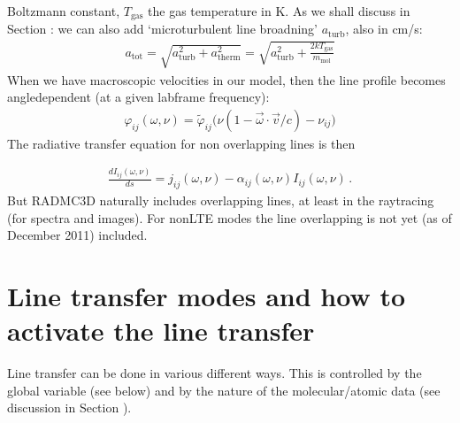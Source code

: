 \documentclass[letterpaper,10pt,english]{sphinxmanual}
\begin{document}
Boltzmann constant, \(T_{\mathrm{gas}}\) the gas temperature in K. As we shall
discuss in Section {\hyperref[\detokenize{lineradtrans:sec-turb-broadening}]{}}: we can also add
‘microturbulent line broadning’ \(a_{\mathrm{turb}}\), also in cm/s:
\begin{equation*}
\begin{split}a_{\mathrm{tot}}=\sqrt{a^2_{\mathrm{turb}}+a^2_{\mathrm{therm}}}=
\sqrt{a^2_{\mathrm{turb}}+\frac{2kT_{\mathrm{gas}}}{m_{\mathrm{mol}}}}\end{split}
\end{equation*}
When we have macroscopic velocities in our model, then the line profile
becomes angle\sphinxhyphen{}dependent (at a given lab\sphinxhyphen{}frame frequency):
\begin{equation*}
\begin{split}\varphi_{ij}(\omega,\nu) = \tilde\varphi_{ij}\big(\nu(1-\vec\omega\cdot \vec v/c)-\nu_{ij}\big)\end{split}
\end{equation*}
The radiative transfer equation for non overlapping lines is then

\label{\detokenize{lineradtrans:eq-molec-rad-trans-eq}}\begin{equation*}
\begin{split}\frac{dI_{ij}(\omega,\nu)}{ds} = j_{ij}(\omega,\nu) -
\alpha_{ij}(\omega,\nu) I_{ij}(\omega,\nu)\,.\end{split}
\end{equation*}
But RADMC\sphinxhyphen{}3D naturally includes overlapping lines, at least in the
ray\sphinxhyphen{}tracing (for spectra and images). For non\sphinxhyphen{}LTE modes the line
overlapping is not yet (as of December 2011) included.


\section{Line transfer modes and how to activate the line transfer}
\label{\detokenize{lineradtrans:line-transfer-modes-and-how-to-activate-the-line-transfer}}\label{\detokenize{lineradtrans:sec-line-trans-modes}}
Line transfer can be done in various different ways. This is controlled by the
global variable  (see below) and by the nature of the
molecular/atomic data (see discussion in Section {\hyperref[\detokenize{lineradtrans:sec-line-dot-inp}]{}}).
\end{document}

